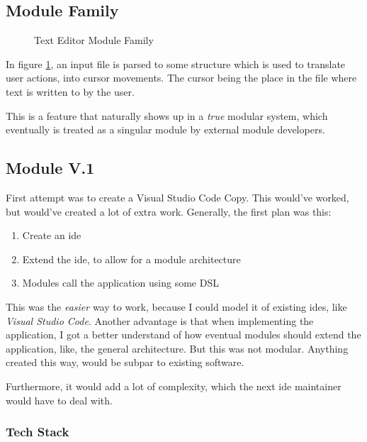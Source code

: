 \subsection{Module Family}

\begin{figure}
  \centering
  
  \caption{Text Editor Module Family}
  \label{fig:textEditorSimple}
\end{figure}

In figure \ref{fig:textEditorSimple}, an input file is parsed to some structure
which is used to translate user actions, into cursor movements. The cursor being
the place in the file where text is written to by the user.

This is a feature that naturally shows up in a \textit{true} modular system,
which eventually is treated as a singular module by external module developers.

\subsection{Module V.1}


First attempt was to create a Visual Studio Code Copy. This would've worked, but
would've created a lot of extra work.
Generally, the first plan was this:

\begin{enumerate}
  \item Create an \gls{ide}
  \item Extend the \gls{ide}, to allow for a module architecture
  \item Modules call the application using some DSL
\end{enumerate}

This was the \textit{easier} way to work, because I could model it of existing
\gls{ide}s, like \textit{Visual Studio Code}. Another advantage is that when
implementing the application, I got a better understand of how eventual modules
should extend the application, like, the general architecture. But this was not
modular. Anything created this way, would be subpar to existing software.

Furthermore, it would add a lot of complexity, which the next \gls{ide}
maintainer would have to deal with.

\subsubsection{Tech Stack}


